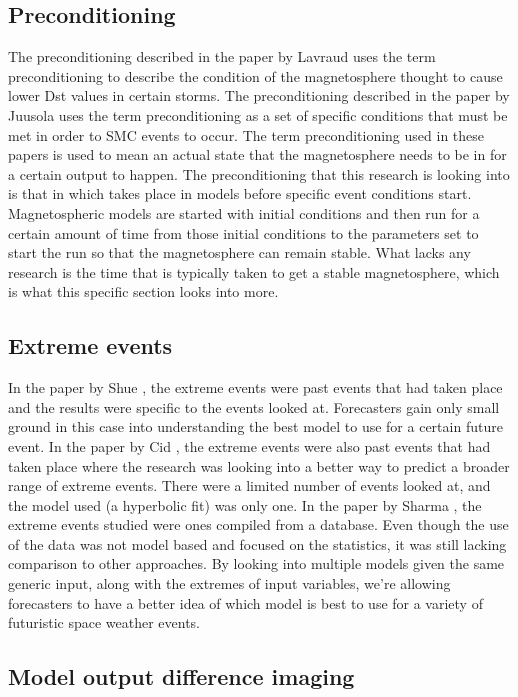 \subsection{Preconditioning}
The preconditioning described in the paper by Lavraud \cite{Lavraud2006} uses
the term preconditioning to describe the condition of the magnetosphere thought
to cause lower Dst values in certain storms.
The preconditioning described in the paper by Juusola \cite{Juusola2013} uses
the term preconditioning as a set of specific conditions that must be met in
order to SMC events to occur.
The term preconditioning used in these papers is used to mean an actual state
that the magnetosphere needs to be in for a certain output to happen. The
preconditioning that this research is looking into is that in which takes place
in models before specific event conditions start. Magnetospheric models are
started with initial conditions and then run for a certain amount of time from
those initial conditions to the parameters set to start the run so that the
magnetosphere can remain stable. What lacks any research is the time that is
typically taken to get a stable magnetosphere, which is what this specific
section looks into more.
\subsection{Extreme events}
In the paper by Shue \cite{Shue1998}, the extreme events were past events that
had taken place and the results were specific to the events looked at.
Forecasters gain only small ground in this case into understanding the best
model to use for a certain future event.
In the paper by Cid \cite{Cid2013}, the extreme events were also past events
that had taken place where the research was looking into a better way to predict
a broader range of extreme events. There were a limited number of events looked
at, and the model used (a hyperbolic fit) was only one.
In the paper by Sharma \cite{Sharma2011}, the extreme events studied were ones
compiled from a database. Even though the use of the data was not model
based and focused on the statistics, it was still lacking comparison to other approaches.
By looking into multiple models given the same generic input, along with the
extremes of input variables, we're allowing forecasters to have a better idea of
which model is best to use for a variety of futuristic space weather events.
\subsection{Model output difference imaging}

